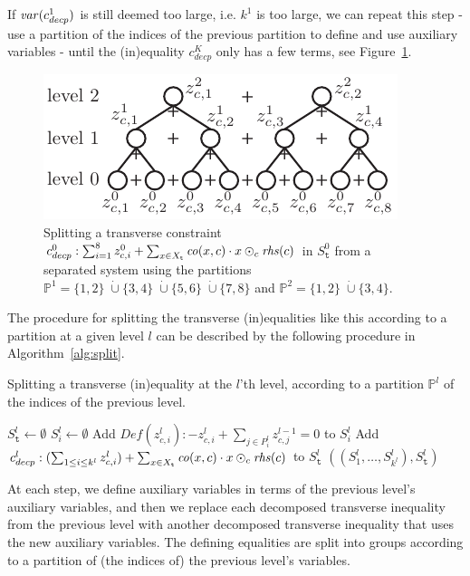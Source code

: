 If $\mathit{var}(c_{decp}^1)$ is still deemed too large, i.e. $k^1$ is too large, we can repeat this step - use a partition of the indices of the previous partition to define and use auxiliary variables - until the (in)equality $c_{decp}^K$ only has a few terms, see Figure~\ref{fig:split}.
%
\begin{figure}
	\centering
		\includegraphics{figures/split.pdf}
	\caption{Splitting a transverse constraint $c^0_{decp}: \sum_{i = 1}^8 z^0_{c,i} + \sum_{x\in X_{\texttt{t}}}\mathit{co}(x,c)\cdot x\odot_c \mathit{rhs}(c)$ in $S_\texttt{t}^0$ from a separated system using the partitions $\mathbb{P}^1 = \{1,2\}\;\dot\cup\{3,4\}\;\dot\cup\{5,6\}\;\dot\cup\{7,8\}$ and $\mathbb{P}^2 = \{1,2\}\;\dot\cup\{3,4\}$. 
	}
	\label{fig:split}
\end{figure}
%
The procedure for splitting the transverse (in)equalities like this according to a partition at a given level $l$ can be described by the following procedure  in Algorithm~\ref{alg:split}.
%

\begin{algorithm}
\caption{Splitting a transverse (in)equality at the $l$'th level, according to a partition $\mathbb{P}^l$ of the indices of the previous level.}
\label{alg:split}
\begin{algorithmic}[1]
\Function{SplitTransverse}{%
Transverse (in)equalities $S^0_\texttt{t}$, partitions $\mathbb{P}^l = (P^l_1, \ldots, P^l_{k^l})$}
	\State $S_\texttt{t}^l\gets \emptyset$%
		\State $S^l_i \gets \emptyset$ 
				\State Add $\mathit{Def}(z^l_{c,i}): -z^l_{c,i} + \sum_{j\in P^l_i} z^{l-1}_{c,j} = 0$ to $S^l_i$
		\EndFor
		\State Add $c_{decp}^l: (\sum_{1\leq i\leq k^l} z^l_{c,i}) + \sum_{x\in X_{\texttt{t}}}\mathit{co}(x,c)\cdot x \odot_c \mathit{rhs}(c)$
 to $S_\texttt{t}^l$
	\EndFor
	\State\Return $((S^l_1,\ldots, S^l_{k^l}), S^l_\texttt{t})$
\EndFunction
\end{algorithmic}
\end{algorithm}
%
At each step, we define auxiliary variables in terms of the previous level's auxiliary variables, and then we replace each decomposed transverse inequality from the previous level with another decomposed transverse inequality that uses the new auxiliary variables. The defining equalities are split into groups according to a partition of (the indices of) the previous level's variables.

